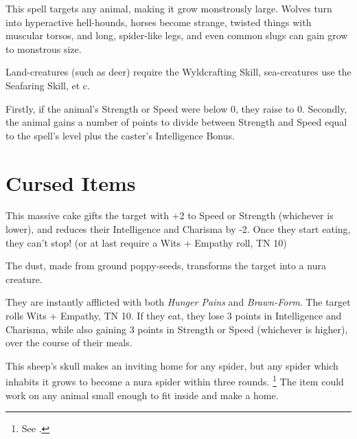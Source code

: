 \begin{multicols}{2}
\spelllevel


This spell targets any animal, making it grow monstrously large.
Wolves turn into hyperactive hell-hounds, horses become strange, twisted things with muscular torsos, and long, spider-like legs, and even common slugs can gain grow to monstrous size.

Land-creatures (such as deer) require the Wyldcrafting Skill, sea-creatures use the Seafaring Skill, et c.

Firstly, if the animal's Strength or Speed were below 0, they raise to 0.
Secondly, the animal gains a number of points to divide between Strength and Speed equal to the spell's level plus the caster's Intelligence Bonus.

\end{multicols}

\section{Cursed Items}

\begin{multicols}{2}

\label{birthdayCake}

This massive cake gifts the target with +2 to Speed or Strength (whichever is lower), and reduces their Intelligence and Charisma by -2.
Once they start eating, they can't stop!
(or at last require a Wits + Empathy roll, TN 10)

\label{ogredust}

The dust, made from ground poppy-seeds, transforms the target into a nura creature.

They are instantly afflicted with both \textit{Hunger Pains} and \textit{Brawn-Form}.
The target rolls Wits + Empathy, TN 10.
If they eat, they lose 3 points in Intelligence and Charisma, while also gaining 3 points in Strength or Speed (whichever is higher), over the course of their meals.

\label{spiderskull}

This sheep's skull makes an inviting home for any spider, but any spider which inhabits it grows to become a nura spider within three rounds.
\footnote{See .}
The item could work on any animal small enough to fit inside and make a home.

\end{multicols}
